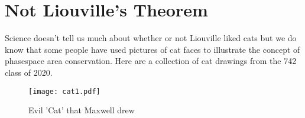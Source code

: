 \section{Not Liouville's Theorem}
Science doesn't tell us much about whether or not Liouville liked cats but we do know that some people have used pictures of cat faces to illustrate the concept of phasespace area conservation. 
Here are a collection of cat drawings from the 742 class of 2020.

\begin{centering}
\begin{figure}
	\texttt{[image: cat1.pdf]}
  \caption{Evil 'Cat' that Maxwell drew}
  \label{fig:catto}
\end{figure}
\end{centering}



\clearpage
